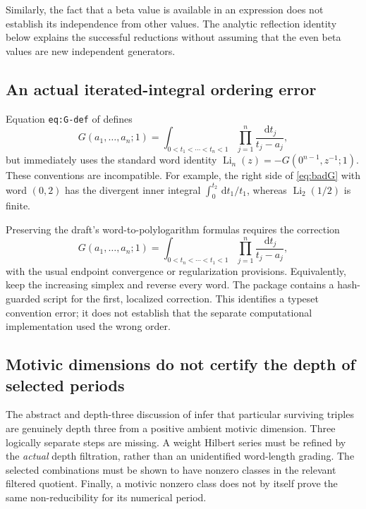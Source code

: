 \documentclass[11pt]{article}
\numberwithin{equation}{section}
\theoremstyle{definition}\newtheorem{definition}[theorem]{Definition}
\theoremstyle{remark}\newtheorem{remark}[theorem]{Remark}
\DeclareMathOperator{\Li}{Li}
\newcommand{\dd}{\,\mathrm d}
\newcommand{\src}[1]{\nolinkurl{#1}}
\begin{document}
Similarly, the fact that a beta value is available in an expression does not establish its independence from other values. The analytic reflection identity below explains the successful reductions without assuming that the even beta values are new independent generators.

\subsection{An actual iterated-integral ordering error}
Equation \src{eq:G-def} of \cite{repoDouble} defines
\begin{equation}\label{eq:badG}
 G(a_1,\ldots,a_n;1)=
 \int_{0<t_1<\cdots<t_n<1}\prod_{j=1}^n\frac{\dd t_j}{t_j-a_j},
\end{equation}
but immediately uses the standard word identity
$\Li_n(z)=-G(0^{n-1},z^{-1};1)$. These conventions are incompatible. For example, the right side of \eqref{eq:badG} with word $(0,2)$ has the divergent inner integral $\int_0^{t_2}\dd t_1/t_1$, whereas $\Li_2(1/2)$ is finite.

Preserving the draft's word-to-polylogarithm formulas requires the correction
\begin{equation}\label{eq:goodG}
 G(a_1,\ldots,a_n;1)=
 \int_{0<t_n<\cdots<t_1<1}\prod_{j=1}^n\frac{\dd t_j}{t_j-a_j},
\end{equation}
with the usual endpoint convergence or regularization provisions. Equivalently, keep the increasing simplex and reverse every word. The package contains a hash-guarded script for the first, localized correction. This identifies a typeset convention error; it does not establish that the separate computational implementation used the wrong order.

\subsection{Motivic dimensions do not certify the depth of selected periods}
The abstract and depth-three discussion of \cite{repoDouble} infer that particular surviving triples are genuinely depth three from a positive ambient motivic dimension. Three logically separate steps are missing. A weight Hilbert series must be refined by the \emph{actual} depth filtration, rather than an unidentified word-length grading. The selected combinations must be shown to have nonzero classes in the relevant filtered quotient. Finally, a motivic nonzero class does not by itself prove the same non-reducibility for its numerical period.
\end{document}
